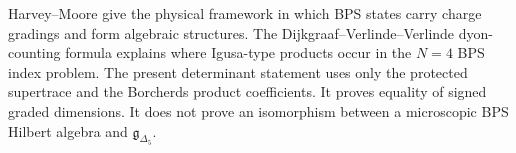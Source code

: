 \begin{remark}
Harvey--Moore \cite{HM} give the physical framework in which BPS
states carry charge gradings and form algebraic structures.  The
Dijkgraaf--Verlinde--Verlinde dyon-counting formula \cite{DVV} explains
where Igusa-type products occur in the $N=4$ BPS index problem.
The present determinant statement uses only the protected supertrace and
the Borcherds product coefficients.  It proves equality of signed
graded dimensions.  It does not prove an isomorphism between a
microscopic BPS Hilbert algebra and $\mathfrak g_{\Delta_5}$.
\end{remark}
